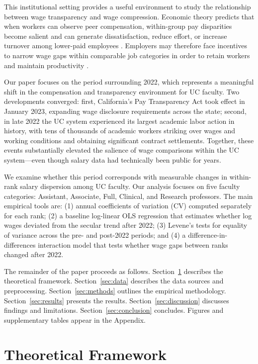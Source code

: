 \documentclass[12pt]{article}
\begin{document}
This institutional setting provides a useful environment to study the
relationship between wage transparency and wage compression. Economic
theory predicts that when workers can observe peer compensation,
within-group pay disparities become salient and can generate
dissatisfaction, reduce effort, or increase turnover among lower-paid
employees \citep[p.~2981]{card2012}. Employers may therefore face
incentives to narrow wage gaps within comparable job categories in order
to retain workers and maintain productivity \citep{cullen2022}.

Our paper focuses on the period surrounding 2022, which represents a
meaningful shift in the compensation and transparency environment for UC
faculty. Two developments converged: first, California's Pay
Transparency Act took effect in January 2023, expanding wage disclosure
requirements across the state; second, in late 2022 the UC system
experienced its largest academic labor action in history, with tens of
thousands of academic workers striking over wages and working conditions
and obtaining significant contract settlements. Together, these events
substantially elevated the salience of wage comparisons within the UC
system---even though salary data had technically been public for years.

We examine whether this period corresponds with measurable changes in
within-rank salary dispersion among UC faculty. Our analysis focuses on
five faculty categories: Assistant, Associate, Full, Clinical, and
Research professors. The main empirical tools are: (1) annual
coefficients of variation (CV) computed separately for each rank; (2) a
baseline log-linear OLS regression that estimates whether log wages
deviated from the secular trend after 2022; (3) Levene's tests for
equality of variance across the pre- and post-2022 periods; and (4) a
difference-in-differences interaction model that tests whether wage
gaps between ranks changed after 2022.

The remainder of the paper proceeds as follows. Section~\ref{sec:theory}
describes the theoretical framework. Section~\ref{sec:data} describes
the data sources and preprocessing. Section~\ref{sec:methods} outlines
the empirical methodology. Section~\ref{sec:results} presents the
results. Section~\ref{sec:discussion} discusses findings and limitations.
Section~\ref{sec:conclusion} concludes. Figures and supplementary tables
appear in the Appendix.

\section{Theoretical Framework}
\label{sec:theory}
\end{document}
